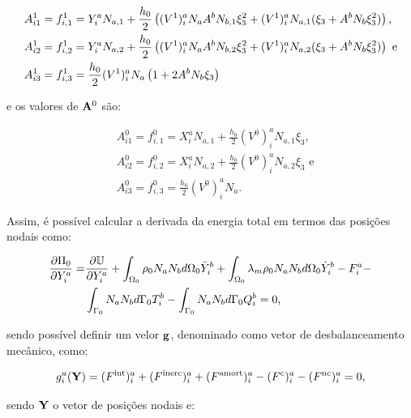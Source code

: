 \documentclass[_ArquivoPrincipal.tex]{subfiles}
\begin{document}
\begin{subequations}
    \begin{align}
         & A_{i1}^1=f_{i,1}^1=Y_i^aN_{a,1}+\frac{h_0}{2}\left({(V^1)_i^aN_aA^bN_{b,1}\xi_3^2+(V^1)_i^aN_{a,1}(\xi_3+A^bN_b\xi_3^2)}\right)\text{,}  \\
         & A_{i2}^1=f_{i,2}^1=Y_i^aN_{a,2}+\frac{h_0}{2}\left({(V^1)_i^aN_aA^bN_{b,2}\xi_3^2+(V^1)_i^aN_{a,2}(\xi_3+A^bN_b\xi_3^2)}\right)\text{ e} \\
         & A_{i3}^1=f_{i,3}^1=\frac{h_0}{2}(V^1)_i^aN_a\left({1+2A^bN_b\xi_3}\right)
    \end{align}
    \label{eq:CSD-A1}
\end{subequations}

\noindent e os valores de $\mathbf{A}^0$ são:

\begin{subequations}
    \begin{align}
         & A_{i1}^0=f_{i,1}^0=X_i^aN_{a,1}+\frac{h_0}{2}(V^0)_i^aN_{a,1}\xi_3\text{,}  \\
         & A_{i2}^0=f_{i,2}^0=X_i^aN_{a,2}+\frac{h_0}{2}(V^0)_i^aN_{a,2}\xi_3\text{ e} \\
         & A_{i3}^0=f_{i,3}^0=\frac{h_0}{2}(V^0)_i^aN_a\text{.}
    \end{align}
    \label{eq:CSD-A0}
\end{subequations}

Assim, é possível calcular a derivada da energia total em termos das posições nodais como:

\begin{equation}
    \begin{split}
        \frac{\partial{\Pi_0}}{\partial{Y_i^a}}=&\frac{\partial{\mathbb{U}}}{\partial{Y_i^a}}
        +\int_{\Omega_0}{\rho_0N_aN_b d\Omega_0}\ddot{Y}_i^b+
        \int_{\Omega_0}{\lambda_m\rho_0N_aN_b d\Omega_0}\dot{Y}_i^b
        -F_i^a-\\
        &\int_{\Gamma_0}{N_aN_b d\Gamma_0}T_i^b
        -\int_{\Gamma_0}{N_aN_b d\Gamma_0}Q_i^b=0\text{,}
    \end{split}
\end{equation}

\noindent sendo possível definir um velor $\mathbf{g}$, denominado como vetor de desbalanceamento mecânico, como:

\begin{equation}
    g_i^a(\mathbf{Y})=(F^\mathrm{int})_i^a+(F^\mathrm{inerc})_i^a+(F^\mathrm{amort})_i^a-(F^\mathrm{c})_i^a-(F^\mathrm{nc})_i^a=0\text{,}
    \label{eq:CSD-g}
\end{equation}

\noindent sendo $\mathbf{Y}$ o vetor de posições nodais e:
\end{document}
